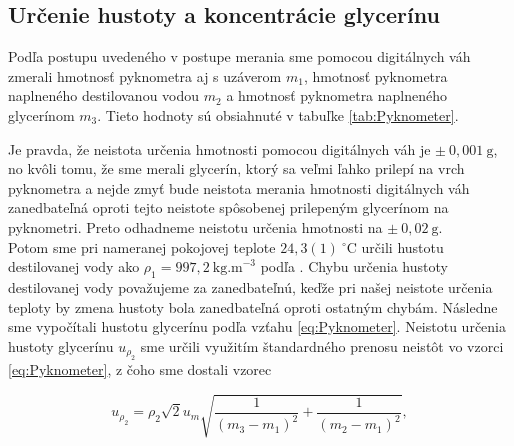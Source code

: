 \documentclass{prepareprotokol} %
\begin{document}
\subsection*{Určenie hustoty a koncentrácie glycerínu}

Podľa postupu uvedeného v postupe merania sme pomocou digitálnych váh zmerali hmotnosť pyknometra aj s uzáverom $m_1$, hmotnosť pyknometra naplneného destilovanou vodou $m_2$ a hmotnosť pyknometra naplneného glycerínom $m_3$. 
Tieto hodnoty sú obsiahnuté v tabuľke \ref{tab:Pyknometer}.

\begin{table}[H]
    \centering
    \renewcommand{\arraystretch}{1.2}
    \caption{Meranie hmotností}
    \label{tab:Pyknometer}
\end{table}


Je pravda, že neistota určenia hmotnosti pomocou digitálnych váh je $\pm~0,001~\mathrm{g}$, no kvôli tomu, že sme merali glycerín, ktorý sa veľmi ľahko prilepí na vrch pyknometra a nejde zmyť bude neistota merania hmotnosti digitálnych váh zanedbateľná oproti tejto neistote spôsobenej prilepeným glycerínom na pyknometri. 
Preto odhadneme neistotu určenia hmotnosti na $\pm~0,02~\mathrm{g}$.\\

Potom sme pri nameranej pokojovej teplote $24,3(1)~^\circ \mathrm{C}$ určili hustotu destilovanej vody ako $\rho_1 = 997,2~\mathrm{kg.m}^{-3}$ podľa \cite{MatFyzTabulky}.
Chybu určenia hustoty destilovanej vody považujeme za zanedbateľnú, keďže pri našej neistote určenia teploty by zmena hustoty bola zanedbateľná oproti ostatným chybám. 
Následne sme vypočítali hustotu glycerínu podľa vzťahu \ref{eq:Pyknometer}. 
Neistotu určenia hustoty glycerínu $u_{\rho_2}$ sme určili využitím štandardného prenosu neistôt vo vzorci \ref{eq:Pyknometer}, z čoho sme dostali vzorec


\begin{equation}
		u_{\rho_2} = \rho_2\sqrt{2}u_m\sqrt{\frac{1}{(m_3-m_1)^2}+\frac{1}{(m_2-m_1)^2}},
		\label{eq:ChybaHustota}
\end{equation} \\
\end{document}
